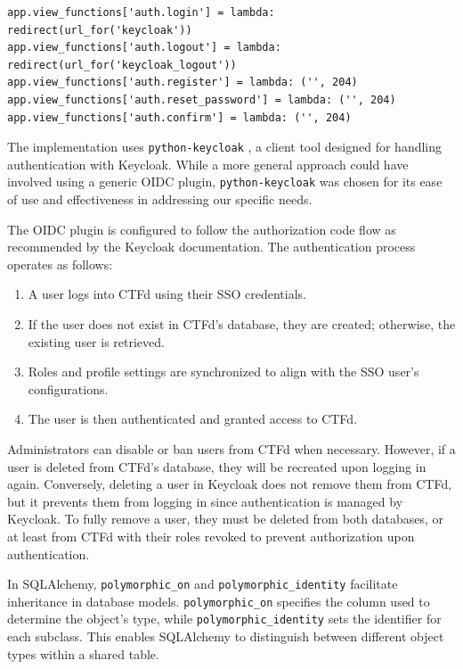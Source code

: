 \begin{verbatim}
app.view_functions['auth.login'] = lambda: redirect(url_for('keycloak'))
app.view_functions['auth.logout'] = lambda: redirect(url_for('keycloak_logout'))
app.view_functions['auth.register'] = lambda: ('', 204)
app.view_functions['auth.reset_password'] = lambda: ('', 204)
app.view_functions['auth.confirm'] = lambda: ('', 204)
\end{verbatim}

The implementation uses \texttt{python-keycloak} \parencite{python_keycloak}, a client tool designed for handling authentication with Keycloak. While a more general approach could have involved using a generic OIDC plugin, \texttt{python-keycloak} was chosen for its ease of use and effectiveness in addressing our specific needs. 

The OIDC plugin is configured to follow the authorization code flow as recommended by the Keycloak documentation. The authentication process operates as follows:

\begin{enumerate}
    \item A user logs into CTFd using their SSO credentials.
    \item If the user does not exist in CTFd's database, they are created; otherwise, the existing user is retrieved.
    \item Roles and profile settings are synchronized to align with the SSO user's configurations.
    \item The user is then authenticated and granted access to CTFd.
\end{enumerate}

Administrators can disable or ban users from CTFd when necessary. However, if a user is deleted from CTFd's database, they will be recreated upon logging in again. Conversely, deleting a user in Keycloak does not remove them from CTFd, but it prevents them from logging in since authentication is managed by Keycloak. To fully remove a user, they must be deleted from both databases, or at least from CTFd with their roles revoked to prevent authorization upon authentication.

In SQLAlchemy, \texttt{polymorphic\_on} and \texttt{polymorphic\_identity} facilitate inheritance in database models. \texttt{polymorphic\_on} specifies the column used to determine the object's type, while \texttt{polymorphic\_identity} sets the identifier for each subclass. This enables SQLAlchemy to distinguish between different object types within a shared table.

